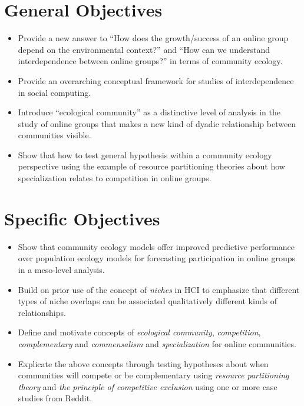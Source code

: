 \documentclass[12pt]{memoir}
\begin{document}
\section{General Objectives}

\begin{itemize}
\item Provide a new answer to ``How does the growth/success of an online group depend on the environmental context?''  and ``How can we understand interdependence between online groups?'' in terms of community ecology.

\item Provide an overarching conceptual framework for studies of interdependence in social computing.

\item Introduce ``ecological community'' as a distinctive level of analysis in the study of online groups that makes a new kind of dyadic relationship between communities visible.

\item Show that how to test general hypothesis within a community ecology perspective using the example of resource partitioning theories about how specialization relates to competition in online groups.

\end{itemize}

\section{Specific Objectives}
\begin{itemize}

\item Show that community ecology models offer improved predictive performance over population ecology models for forecasting participation in online groups in a meso-level analysis.

\item Build on prior use of the concept of \emph{niches} in HCI to emphasize that different types of niche overlaps can be associated qualitatively different kinds of relationships.

\item Define and motivate concepts of \emph{ecological community}, \emph{competition}, \emph{complementary} and \emph{commensalism} and \emph{specialization} for online communities.

\item Explicate the above concepts through testing hypotheses about when communities will compete or be complementary using \emph{resource partitioning theory} and \emph{the principle of competitive exclusion} using one or more case studies from Reddit.

\end{itemize}
\end{document}
